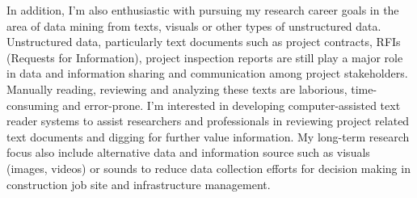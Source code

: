 \documentclass[a4paper,11pt]{article}
\begin{document}
%
In addition, I'm also enthusiastic with pursuing my research career goals in the area of data mining from texts, visuals or other types of unstructured data.
%
Unstructured data, particularly text documents such as project contracts, RFIs (Requests for Information), project inspection reports are still play a major role in data and information sharing and communication among project stakeholders.
%
Manually reading, reviewing and analyzing these texts are laborious, time-consuming and error-prone. 
%
I'm interested in developing computer-assisted text reader systems to assist researchers and professionals in reviewing project related text documents and digging for further value information.
%
My long-term research focus also include alternative data and information source such as visuals (images, videos) or sounds to reduce data collection efforts for decision making in construction job site and infrastructure management.
%
%
%
%
\end{document}
